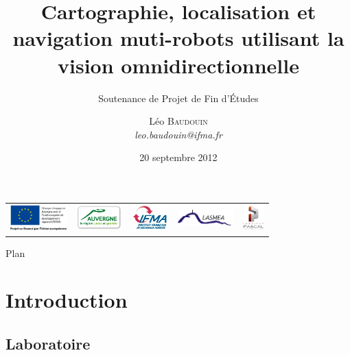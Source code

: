 \documentclass{beamer}
\title{Cartographie, localisation et navigation muti-robots utilisant la vision omnidirectionnelle}
\subtitle{Soutenance de Projet de Fin d'\'Etudes}
\author{L\'eo \textsc{Baudouin}\\\emph{leo.baudouin@ifma.fr}}
\institute{
  Institut Pascal (LASMEA)
}
\date{20 septembre 2012}
\begin{document}
\begin{frame}
  \titlepage
  \begin{tabular}{c c c c c}
    \begin{minipage}{0.2\linewidth}
      \includegraphics[height=10mm]{images/EU.jpg}
    \end{minipage}
    &
    \begin{minipage}{0.15\linewidth}
      \includegraphics[height=10mm]{images/auvergne.png}
    \end{minipage}
    &
    \begin{minipage}{0.12\linewidth}
      \includegraphics[height=10mm]{images/logo-IFMA.jpg}
    \end{minipage}
    &
    \begin{minipage}{0.2\linewidth}
      \includegraphics[height=6mm]{images/logo-LASMEA}
    \end{minipage}
    &
    \begin{minipage}{0.2\linewidth}
      \includegraphics[height=10mm]{images/logo-IP}
    \end{minipage}
  \end{tabular}
\end{frame}


\begin{frame}{Plan}
  \tableofcontents
\end{frame}


\section{Introduction}
\subsection*{Laboratoire}
\end{document}
